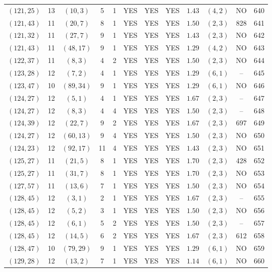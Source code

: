 \begin{longtable}{|c|c|c|c|c|c|c|c|c|c|c|c|}
$(121,25)$ & 13 & $(10,3)$ & 5 & 1 & YES & YES & YES & $1.43$ & $(4,2)$ & NO & 640\\
$(121,43)$ & 11 & $(20,7)$ & 8 & 1 & YES & YES & YES & $1.50$ & $(2,3)$ & 828 & 641\\
$(121,32)$ & 11 & $(27,7)$ & 9 & 1 & YES & YES & YES & $1.43$ & $(2,3)$ & NO & 642\\
$(121,43)$ & 11 & $(48,17)$ & 9 & 1 & YES & YES & YES & $1.29$ & $(4,2)$ & NO & 643\\
$(122,37)$ & 11 & $(8,3)$ & 4 & 2 & YES & YES & YES & $1.50$ & $(2,3)$ & NO & 644\\
$(123,28)$ & 12 & $(7,2)$ & 4 & 1 & YES & YES & YES & $1.29$ & $(6,1)$ & -- & 645\\
$(123,47)$ & 10 & $(89,34)$ & 9 & 1 & YES & YES & YES & $1.29$ & $(6,1)$ & NO & 646\\
$(124,27)$ & 12 & $(5,1)$ & 4 & 1 & YES & YES & YES & $1.67$ & $(2,3)$ & -- & 647\\
$(124,27)$ & 12 & $(8,3)$ & 4 & 4 & YES & YES & YES & $1.50$ & $(2,3)$ & -- & 648\\
$(124,39)$ & 12 & $(22,7)$ & 9 & 2 & YES & YES & YES & $1.67$ & $(2,3)$ & 697 & 649\\
$(124,27)$ & 12 & $(60,13)$ & 9 & 4 & YES & YES & YES & $1.50$ & $(2,3)$ & NO & 650\\
$(124,23)$ & 12 & $(92,17)$ & 11 & 4 & YES & YES & YES & $1.43$ & $(2,3)$ & NO & 651\\
$(125,27)$ & 11 & $(21,5)$ & 8 & 1 & YES & YES & YES & $1.70$ & $(2,3)$ & 428 & 652\\
$(125,27)$ & 11 & $(31,7)$ & 8 & 1 & YES & YES & YES & $1.70$ & $(2,3)$ & NO & 653\\
$(127,57)$ & 11 & $(13,6)$ & 7 & 1 & YES & YES & YES & $1.50$ & $(2,3)$ & NO & 654\\
$(128,45)$ & 12 & $(3,1)$ & 2 & 1 & YES & YES & YES & $1.67$ & $(2,3)$ & -- & 655\\
$(128,45)$ & 12 & $(5,2)$ & 3 & 1 & YES & YES & YES & $1.50$ & $(2,3)$ & NO & 656\\
$(128,45)$ & 12 & $(6,1)$ & 5 & 2 & YES & YES & YES & $1.50$ & $(2,3)$ & -- & 657\\
$(128,45)$ & 12 & $(14,5)$ & 6 & 2 & YES & YES & YES & $1.67$ & $(2,3)$ & 612 & 658\\
$(128,47)$ & 10 & $(79,29)$ & 9 & 1 & YES & YES & YES & $1.29$ & $(6,1)$ & NO & 659\\
$(129,28)$ & 12 & $(13,2)$ & 7 & 1 & YES & YES & YES & $1.14$ & $(6,1)$ & NO & 660\\

\end{longtable}
